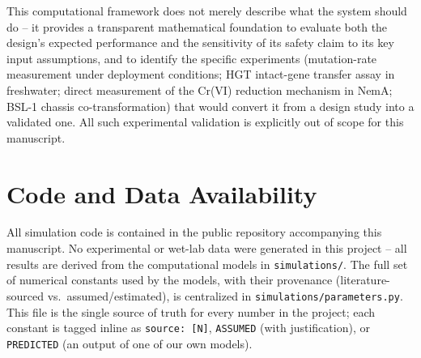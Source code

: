 \documentclass[10pt,twocolumn,letterpaper,
              colorlinks=true,
              linkcolor=blue!70!black,
              citecolor=blue!70!black,
              urlcolor=blue!70!black,
              pdfborder={0 0 0}]{article}
\begin{document}
This computational framework does not merely describe what the system
should do -- it provides a transparent mathematical foundation to evaluate
both the design's expected performance and the sensitivity of its safety
claim to its key input assumptions, and to identify the specific
experiments (mutation-rate measurement under deployment conditions; HGT
intact-gene transfer assay in freshwater; direct measurement of the
Cr(VI) reduction mechanism in NemA; BSL-1 chassis co-transformation)
that would convert it from a design study into a validated one. All such
experimental validation is explicitly out of scope for this manuscript.

\section{Code and Data Availability}

All simulation code is contained in the public repository accompanying
this manuscript. No experimental or wet-lab data were generated in this
project -- all results are derived from the computational models in
\texttt{simulations/}. The full set of numerical constants used by the
models, with their provenance (literature-sourced vs.\
assumed/estimated), is centralized in \texttt{simulations/parameters.py}.
This file is the single source of truth for every number in the project;
each constant is tagged inline as \texttt{source:~[N]},
\texttt{ASSUMED} (with justification), or \texttt{PREDICTED} (an output
of one of our own models).
\end{document}
